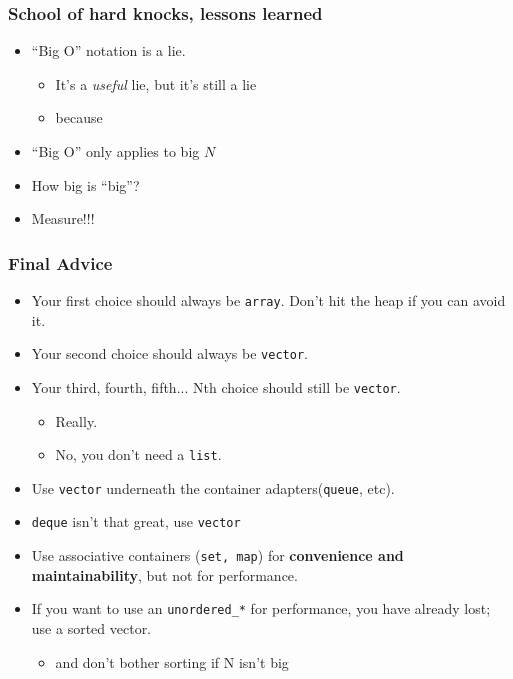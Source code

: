 \begin{frame}[fragile]
  \frametitle{School of hard knocks, lessons learned}
  

\begin{itemize}[<+->]
\item ``Big O'' notation is a lie.
  \begin{itemize}
    \item It's a \emph{useful} lie, but it's still a lie
    \item because 
  \end{itemize}
\item ``Big O'' only applies to big $N$
\item How big is ``big''?
\item Measure!!!
\end{itemize}
\end{frame}

\begin{frame}[fragile]
\frametitle{Final Advice}

\begin{itemize}
\item Your first choice should always be \texttt{array}.  Don't hit
  the heap if you can avoid it.
\item Your second choice should always be \texttt{vector}.
\item Your third, fourth, fifth... Nth choice should still be
  \texttt{vector}.
\begin{itemize}
  \item Really.
  \item No, you don't need a \texttt{list}.
\end{itemize}
\item Use \texttt{vector} underneath the container
  adapters(\texttt{queue}, etc).
\item \texttt{deque} isn't that great, use \texttt{vector}
\item Use associative containers (\texttt{set, map}) for {\bf convenience
  and maintainability}, but not for performance.
\item If you want to use an \texttt{unordered\_*} for performance, you
  have already lost; use a sorted vector.
  \begin{itemize}
  \item and don't bother sorting if N isn't big
  \end{itemize}

\end{itemize}
\end{frame}
